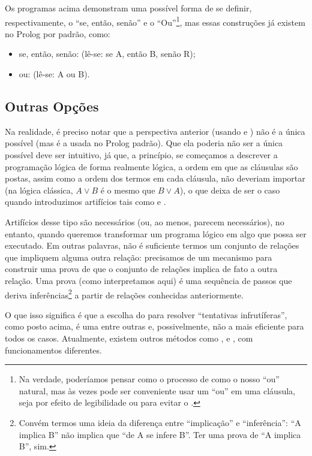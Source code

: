\documentclass{article}
\begin{document}
Os programas acima demonstram uma possível forma de se definir,
respectivamente, o ``se, então, senão'' e o ``Ou''\footnote{Na
  verdade, poderíamos pensar como o processo de
   como o nosso ``ou'' natural, mas às vezes
  pode ser conveniente usar um ``ou'' em uma cláusula, seja por efeito
  de legibilidade ou para evitar o .}, mas
essas construções já existem no Prolog por padrão, como:

\begin{itemize}
  \item se, então, senão:  (lê-se: se A, então
    B, senão R);
  \item ou:  (lê-se: A ou B).
\end{itemize}


\subsection{Outras Opções}

Na realidade, é preciso notar que a perspectiva anterior (usando
 e ) não é a única
possível (mas é a usada no Prolog padrão). Que ela poderia não ser a
única possível deve ser intuitivo, já que, a princípio, se começamos a
descrever a programação lógica de forma realmente lógica, a ordem em
que as cláusulas são postas, assim como a ordem dos termos em cada
cláusula, não deveriam importar (na lógica clássica, $A \vee B$ é o
mesmo que $B \vee A$), o que deixa de ser o caso quando introduzimos
artifícios tais como  e
.

Artifícios desse tipo são necessários (ou, ao menos, parecem
necessários), no entanto, quando queremos transformar um programa
lógico em algo que possa ser executado. Em outras palavras, não é
suficiente termos um conjunto de relações que impliquem alguma outra
relação: precisamos de um mecanismo para construir uma prova de que o
conjunto de relações implica de fato a outra relação.  Uma prova (como
interpretamos aqui) é uma sequência de passos que deriva
inferências\footnote{Convém termos uma ideia da diferença entre
  ``implicação'' e ``inferência'': ``A implica B'' não implica que
  ``de A se infere B''. Ter uma prova de ``A implica B'', sim.} a
partir de relações conhecidas anteriormente.

O que isso significa é que a escolha do  para
resolver ``tentativas infrutíferas'', como posto acima, é uma entre
outras e, possivelmente, não a mais eficiente para todos os
casos. Atualmente, existem outros métodos como ,  e
, com funcionamentos diferentes.
\end{document}
